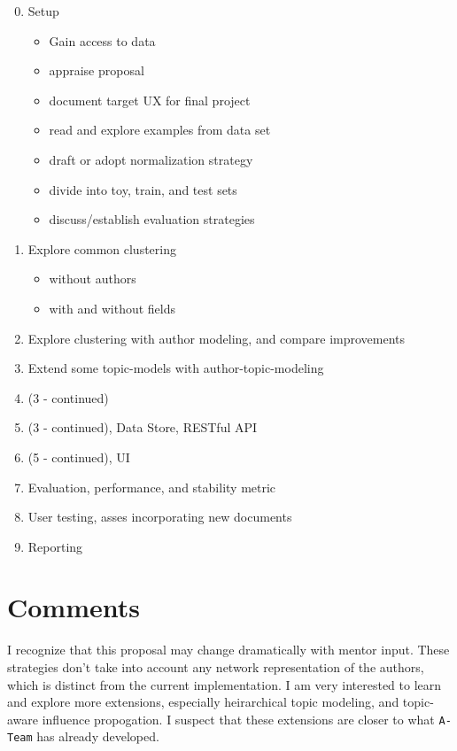 \documentclass{article}
\begin{document}
\begin{multicols}{2}
\begin{enumerate}[\texttt{WK} 1 -]
  \setcounter{enumi}{-1}
\item Setup
  \begin{itemize}
  \item Gain access to data
  \item appraise proposal
  \item document target UX for final project
  \item read and explore examples from data set
  \item draft or adopt normalization strategy
  \item divide into toy, train, and test sets
  \item discuss/establish evaluation strategies
  \end{itemize}
\item Explore common clustering
  \begin{itemize}
  \item without authors
  \item with and without fields
  \end{itemize}
\item Explore clustering with author modeling, and compare improvements
\item Extend some topic-models with author-topic-modeling
\item (3 - continued)
\item (3 - continued), Data Store, RESTful API
\item (5 - continued), UI
\item Evaluation, performance, and stability metric
\item User testing, asses incorporating new documents
\item Reporting
\end{enumerate}

\section{Comments}

I recognize that this proposal may change dramatically with mentor input.
These strategies don't take into account any network representation of the authors,
which is distinct from the current implementation.
I am very interested to learn and explore more extensions, especially heirarchical
topic modeling, and topic-aware influence propogation. I suspect that these
extensions are closer to what \texttt{A-Team} has already developed.



\end{multicols}
\end{document}
